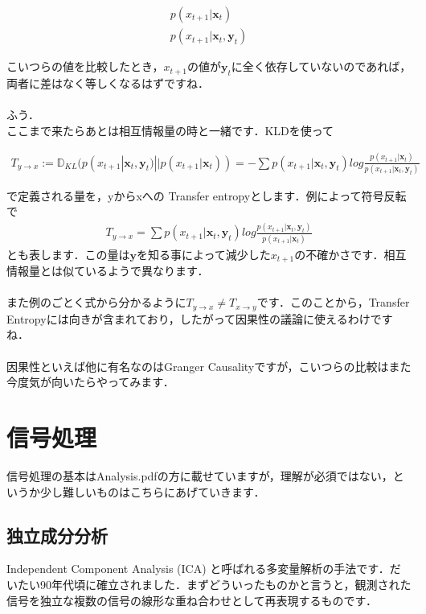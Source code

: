\documentclass[11pt,a4paper,uplatex]{ujreport}
\begin{document}
\begin{eqnarray}
\label{eq:TL1}
  p(x_{t+1}| \mathbf{x}_t) \nonumber \\
  p(x_{t+1}| \mathbf{x}_t, \mathbf{y}_t) \nonumber
\end{eqnarray}

こいつらの値を比較したとき，$x_{t+1}$の値が$\mathbf{y}_t$に全く依存していないのであれば，両者に差はなく等しくなるはずですね．\\
\\
ふう．
\\
ここまで来たらあとは相互情報量の時と一緒です．KLDを使って

\begin{eqnarray}
\label{eq:TE1}
  T_{y\rightarrow x} := \mathbb{D}_{KL}(p(x_{t+1}| \mathbf{x}_t, \mathbf{y}_t) || p(x_{t+1}| \mathbf{x}_t)) = -\sum p(x_{t+1}| \mathbf{x}_t, \mathbf{y}_t) log \frac{p(x_{t+1}| \mathbf{x}_t)}{p(x_{t+1}| \mathbf{x}_t, \mathbf{y}_t)} 
\end{eqnarray}

で定義される量を，yからxへの Transfer entropyとします．例によって符号反転で
\begin{eqnarray}
\label{eq:TE2}
  T_{y\rightarrow x} = \sum p(x_{t+1}| \mathbf{x}_t, \mathbf{y}_t) log \frac{p(x_{t+1}| \mathbf{x}_t, \mathbf{y}_t)}{p(x_{t+1}| \mathbf{x}_t)} 
\end{eqnarray}
とも表します．この量は$\mathbf{y}$を知る事によって減少した$x_{t+1}$の不確かさです．相互情報量とは似ているようで異なります．\\
\\
また例のごとく式から分かるように$T_{y\rightarrow x} \neq T_{x\rightarrow y}$です．このことから，Transfer Entropyには向きが含まれており，したがって因果性の議論に使えるわけですね\cite{kitano}．\\
\\
因果性といえば他に有名なのはGranger Causalityですが，こいつらの比較はまた今度気が向いたらやってみます．

\chapter{信号処理}
信号処理の基本はAnalysis.pdfの方に載せていますが，理解が必須ではない，というか少し難しいものはこちらにあげていきます．

\section{独立成分分析}
Independent Component Analysis (ICA) と呼ばれる多変量解析の手法です．だいたい90年代頃に確立されました．まずどういったものかと言うと，観測された信号を独立な複数の信号の線形な重ね合わせとして再表現するものです．\\
\end{document}
